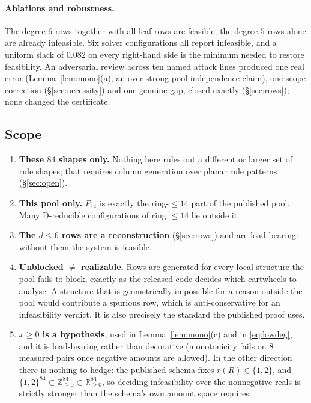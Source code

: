 \documentclass[11pt]{article}
\theoremstyle{definition}
\begin{document}
\paragraph{Ablations and robustness.} The degree-$6$ rows together with all leaf
rows are feasible; the degree-$5$ rows alone are already infeasible. Six solver
configurations all report infeasible, and a uniform slack of $0.082$ on every
right-hand side is the minimum needed to restore feasibility. An adversarial
review across ten named attack lines produced one real error
(Lemma~\ref{lem:mono}(a), an over-strong pool-independence claim), one scope
correction (\S\ref{sec:necessity}) and one genuine gap, closed exactly
(\S\ref{sec:rows}); none changed the certificate.

\subsection{Scope}
\label{sec:scope}

\begin{enumerate}\itemsep2pt
  \item \textbf{These $84$ shapes only.} Nothing here rules out a different or
        larger set of rule shapes; that requires column generation over planar
        rule patterns (\S\ref{sec:open}).
  \item \textbf{This pool only.} $P_{14}$ is exactly the ring-$\le14$ part of the
        published pool. Many D-reducible configurations of ring $\le14$ lie
        outside it.
  \item \textbf{The $d\le6$ rows are a reconstruction} (\S\ref{sec:rows}) and are
        load-bearing: without them the system is feasible.
  \item \textbf{Unblocked $\ne$ realizable.} Rows are generated for every local
        structure the pool fails to block, exactly as the released code decides
        which cartwheels to analyse. A structure that is geometrically impossible
        for a reason outside the pool would contribute a spurious row, which is
        anti-conservative for an infeasibility verdict. It is also precisely the
        standard the published proof uses.
  \item \textbf{$x\ge0$ is a hypothesis}, used in Lemma~\ref{lem:mono}(c) and in
        \eqref{eq:lowdeg}, and it is load-bearing rather than decorative
        (monotonicity fails on $8$ measured pairs once negative amounts are
        allowed). In the other direction there is nothing to hedge: the published
        schema fixes $r(R)\in\{1,2\}$, and
        $\{1,2\}^{84} \subset \mathbb{Z}^{84}_{\ge0} \subset
        \mathbb{R}^{84}_{\ge0}$, so deciding infeasibility over the nonnegative
        reals is strictly stronger than the schema's own amount space requires.
\end{enumerate}
\end{document}
